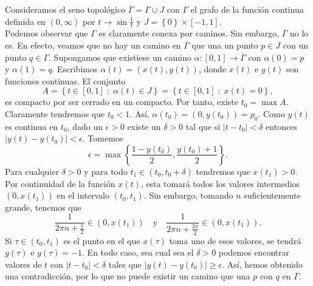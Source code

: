 \begin{eg}
	Consideramos el seno topológico $\displaystyle \overline{\Gamma}=\Gamma \cup J $ con $\displaystyle \Gamma $ el grafo de la función continua definida en $\displaystyle \left(0, \infty \right) $ por $\displaystyle t \to \sin \frac{1}{t} $ y $\displaystyle J = \left\{ 0\right\} \times \left[-1,1\right]  $. \\
	Podemos observar que $\displaystyle \Gamma $ es claramente conexa por caminos. Sin embargo, $\displaystyle \overline{\Gamma } $ no lo es. En efecto, veamos que no hay un camino en $\displaystyle \overline{\Gamma} $ que una un punto $\displaystyle p \in J $ con un punto $\displaystyle q \in \Gamma  $. Supongamos que existiese un camino $\displaystyle \alpha : \left[0,1\right] \to \overline{\Gamma } $ con $\displaystyle \alpha\left(0\right)=p $ y $\displaystyle \alpha\left(1\right)=q $. 
	Escribimos $\displaystyle \alpha\left(t\right)=\left(x\left(t\right), y\left(t\right)\right) $, donde $\displaystyle x\left(t\right) $ e $\displaystyle y\left(t\right) $ son funciones continuas. El conjunto
	\[A = \left\{ t \in \left[0,1\right] \; : \; \alpha\left(t\right)\in J\right\} = \left\{ t \in \left[0,1\right]  \; : \; x\left(t\right)=0\right\}  ,\]
	es compacto por ser cerrado en un compacto. Por tanto, existe $\displaystyle t_{0}=\max A $. Claramente tendremos que $\displaystyle t_{0} < 1 $. Así, $\displaystyle \alpha\left(t_{0}\right)=\left(0, y\left(t_{0}\right)\right)=p_{0} $. 
	Como $\displaystyle y\left(t\right) $ es continua en $\displaystyle t_{0} $, dado un $\displaystyle \epsilon > 0 $ existe un $\displaystyle \delta > 0 $ tal que si $\displaystyle \left|t-t_{0}\right|<\delta  $ entonces $\displaystyle \left|y\left(t\right)-y\left(t_{0}\right)\right|< \epsilon  $. Tomemos 
	\[\epsilon = \max \left\{ \frac{1-y\left(t_{0}\right)}{2}, \frac{y\left(t_{0}\right)+1}{2}\right\}  .\]
Para cualquier $\displaystyle \delta > 0 $ y para todo $\displaystyle t_{1}\in \left(t_{0}, t_{0} + \delta \right) $ tendremos que $\displaystyle x\left(t_{1}\right) > 0 $. Por continuidad de la función $\displaystyle x\left(t\right) $, esta tomará todos los valores intermedios $\displaystyle \left(0, x\left(t_{1}\right)\right) $ en el intervalo $\displaystyle \left(t_{0}, t_{1}\right) $. 
Sin embargo, tomando $\displaystyle n $ suficientemente grande, tenemos que  
\[\frac{1}{2\pi n + \frac{\pi }{2}}\in \left(0, x\left(t_{1}\right)\right) \quad \text{y} \quad \frac{1}{2\pi n + \frac{3\pi }{2}}\in \left(0, x\left(t_{1}\right)\right) .\]
Si $\displaystyle \tau\in\left(t_{0}, t_{1}\right) $ es el punto en el que $\displaystyle x\left(\tau\right) $ toma uno de esos valores, se tendrá $\displaystyle y\left(\tau\right) $ e $\displaystyle y\left(\tau\right)=-1 $. En todo caso, sea cual sea el $\displaystyle \delta > 0 $ podemos encontrar valores de $\displaystyle t $ con $\displaystyle \left|t-t_{0}\right| < \delta  $ tales que $\displaystyle \left|y\left(t\right)-y\left(t_{0}\right)\right|\geq \epsilon  $. 
Así, hemos obtenido una contradicción, por lo que no puede existir un camino que una $\displaystyle p $ con $\displaystyle q $ en $\displaystyle \overline{\Gamma } $. 
\end{eg}
